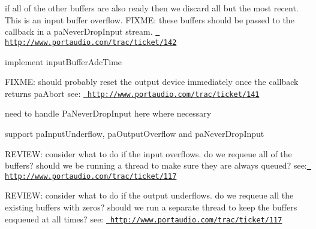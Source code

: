 \begin{DoxyRefList}
\label{todo__todo000024}%
%
 if all of the other buffers are also ready then we discard all but the most recent. This is an input buffer overflow. FIXME\+: these buffers should be passed to the callback in a pa\+Never\+Drop\+Input stream. \href{http://www.portaudio.com/trac/ticket/142}{\texttt{ http\+://www.\+portaudio.\+com/trac/ticket/142}}

\label{todo__todo000025}%
%
implement input\+Buffer\+Adc\+Time 

\label{todo__todo000026}%
%
FIXME\+: should probably reset the output device immediately once the callback returns pa\+Abort see\+: \href{http://www.portaudio.com/trac/ticket/141}{\texttt{ http\+://www.\+portaudio.\+com/trac/ticket/141}} 

\label{todo__todo000027}%
%
need to handle Pa\+Never\+Drop\+Input here where necessary 

\label{todo__todo000022}%
%
support pa\+Input\+Underflow, pa\+Output\+Overflow and pa\+Never\+Drop\+Input  
\item[Member \mbox{\hyperlink{pa__mac__core__internal_8h_a3aa8874a48f232c61d4101706df2b269}{Read\+Stream}} (Pa\+Stream $\ast$stream, void $\ast$buffer, unsigned long frames)]\label{todo__todo000035}%
%
REVIEW\+: consider what to do if the input overflows. do we requeue all of the buffers? should we be running a thread to make sure they are always queued? see\+: \href{http://www.portaudio.com/trac/ticket/117}{\texttt{ http\+://www.\+portaudio.\+com/trac/ticket/117}}  
\item[Member \mbox{\hyperlink{pa__mac__core__internal_8h_a3520d8a8ca48a25c9b99708f6033811d}{Write\+Stream}} (Pa\+Stream $\ast$stream, const void $\ast$buffer, unsigned long frames)]\label{todo__todo000036}%
%
REVIEW\+: consider what to do if the output underflows. do we requeue all the existing buffers with zeros? should we run a separate thread to keep the buffers enqueued at all times? see\+: \href{http://www.portaudio.com/trac/ticket/117}{\texttt{ http\+://www.\+portaudio.\+com/trac/ticket/117}} 
\end{DoxyRefList}